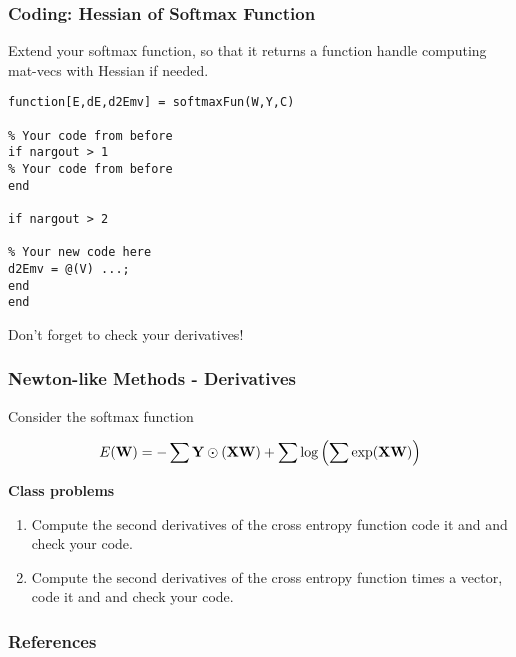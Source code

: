 \documentclass[12pt,fleqn,handout]{beamer}
\begin{document}
\begin{frame}[fragile]\frametitle{Coding: Hessian of Softmax Function}

Extend your softmax function, so that it returns a function handle computing mat-vecs with Hessian if needed.

\begin{verbatim}
function[E,dE,d2Emv] = softmaxFun(W,Y,C)

% Your code from before
if nargout > 1
% Your code from before
end

if nargout > 2

% Your new code here
d2Emv = @(V) ...;
end
end
\end{verbatim}
\begin{center}
	Don't forget to check your derivatives!
\end{center}
\end{frame}


\begin{frame}\frametitle{Newton-like Methods - Derivatives}

Consider the softmax function

$$ E({\bf W}) = -\sum {\bf Y} \odot ({\bf X} {\bf W}) +\sum \log\left (\sum \exp({\bf X} {\bf W}) \right) $$


{\bf Class problems}

\begin{enumerate}
\item
Compute the second derivatives of the cross entropy function code it and and check your code.

\item
Compute the second derivatives of the cross entropy function times a vector, code it and and check your code.

\end{enumerate}


\end{frame}

\begin{frame}[allowframebreaks]
	\frametitle{References}



\end{frame}
\end{document}
